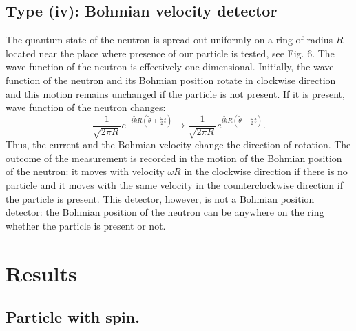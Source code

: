 \documentclass[12pt,preprint,tightenlines]{elsarticle}
\begin{document}
\subsection{  Type {\rm (iv)}: Bohmian velocity detector}

 The quantum state of the neutron
is spread out uniformly on a ring of radius $R$ located near the
place where presence of our particle is tested, see Fig. 6. The  wave
function of the neutron is effectively one-dimensional. Initially, the wave function of the neutron and its Bohmian position rotate
in clockwise direction and this motion remains unchanged if the particle
is not present. If it is present, wave function  of the neutron changes:
\begin{equation}
\frac{1}{\sqrt{2\pi R}}e^{-i\tilde{k}R(\tilde{\theta}+\frac{\omega}{2}t)}\rightarrow\frac{1}{\sqrt{2\pi R}}e^{i\tilde{k}R(\tilde{\theta}-\frac{\omega}{2}t)}.\label{BohmVdet}
\end{equation}
 Thus, the current and the Bohmian velocity change the direction of rotation. The outcome of the measurement is recorded in the motion of
the Bohmian position of the neutron: it moves with velocity $\omega R$
in the clockwise direction if there is no particle and it moves with
the same velocity in the counterclockwise direction if the particle is present.
This detector, however, is not a Bohmian position detector: the Bohmian position of the neutron
 can be anywhere on the ring whether the particle is present or not.



\section{ Results}

\subsection{ Particle with spin.}
\end{document}
